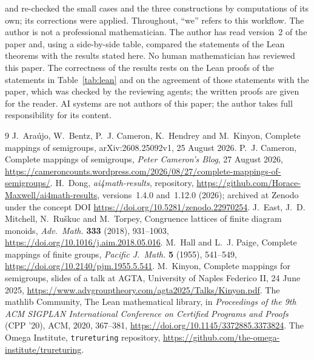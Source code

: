 \documentclass[11pt]{article}
\theoremstyle{remark}
\newcommand{\repoversion}{1.12.0}
\begin{document}
and re-checked the small cases and the three constructions by computations
of its own; its corrections were applied. Throughout, ``we'' refers to this workflow.
The author is not a professional mathematician.
The author has read version~2 of the paper and, using a side-by-side table,
compared the statements of the Lean theorems with the results stated here.
No human mathematician has reviewed this paper. The correctness of the results
rests on the Lean proofs of the statements in Table~\ref{tab:lean} and on the
agreement of those statements with the paper, which was checked by the
reviewing agents; the written proofs are given for the reader. AI systems are
not authors of this paper; the author takes full responsibility for its
content.

\begin{thebibliography}{9}
J.~Ara\'ujo, W.~Bentz, P.~J. Cameron, K.~Hendrey and M.~Kinyon, Complete
mappings of semigroups, arXiv:2608.25092v1, 25 August 2026.
P.~J. Cameron, Complete mappings of semigroups, \emph{Peter Cameron's Blog},
27 August 2026,
\url{https://cameroncounts.wordpress.com/2026/08/27/complete-mappings-of-semigroups/}.
H.~Dong, \emph{ai4math-results}, repository,
\url{https://github.com/Horace-Maxwell/ai4math-results}, versions~1.4.0
and~\repoversion{} (2026); archived at Zenodo under the concept DOI
\url{https://doi.org/10.5281/zenodo.22970254}.
J.~East, J.~D. Mitchell, N.~Ru\v{s}kuc and M.~Torpey, Congruence lattices of
finite diagram monoids, \emph{Adv.\ Math.} \textbf{333} (2018), 931--1003,
\url{https://doi.org/10.1016/j.aim.2018.05.016}.
M.~Hall and L.~J. Paige, Complete mappings of finite groups, \emph{Pacific J.\
Math.} \textbf{5} (1955), 541--549,
\url{https://doi.org/10.2140/pjm.1955.5.541}.
M.~Kinyon, Complete mappings for semigroups, slides of a talk at AGTA,
University of Naples Federico II, 24 June 2025,
\url{https://www.advgrouptheory.com/agta2025/Talks/Kinyon.pdf}.
The mathlib Community, The Lean mathematical library, in \emph{Proceedings of
the 9th ACM SIGPLAN International Conference on Certified Programs and Proofs}
(CPP '20), ACM, 2020, 367--381,
\url{https://doi.org/10.1145/3372885.3373824}.
The Omega Institute, \texttt{trureturing} repository,
\url{https://github.com/the-omega-institute/trureturing}.
\end{thebibliography}
\end{document}
